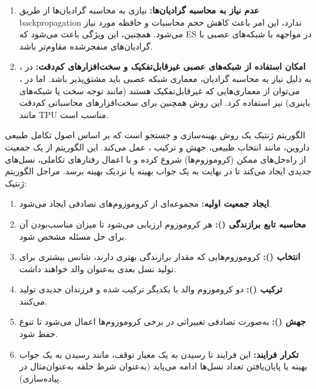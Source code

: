\documentclass[12pt]{exam}
\begin{document}
\begin{questions}
\begin{enumerate}
				\item \textbf{
				عدم نیاز به محاسبه گرادیان‌ها: 
				}
				نیازی به محاسبه گرادیان‌ها از طریق backpropagation ندارد، این امر باعث کاهش حجم محاسبات و حافظه مورد نیاز می‌شود. همچنین، این ویژگی باعث می‌شود که ES در مواجهه با شبکه‌های عصبی با گرادیان‌های منفجرشده
				 مقاوم‌تر باشد.
				\item \textbf{امکان استفاده از شبکه‌های عصبی غیرقابل‌تفکیک و سخت‌افزارهای کم‌دقت: }
				در
				،
				به دلیل نیاز به محاسبه گرادیان، معماری شبکه عصبی باید مشتق‌پذیر باشد. اما در
				،
				می‌توان از معماری‌هایی که غیرقابل‌تفکیک هستند (مانند توجه سخت یا شبکه‌های باینری) نیز استفاده کرد. این روش همچنین برای سخت‌افزارهای محاسباتی کم‌دقت مانند TPU مناسب است.
			\end{enumerate}
		\question الگوریتم ژنتیک  یک روش بهینه‌سازی و جستجو است که بر اساس اصول تکامل طبیعی داروین، مانند انتخاب طبیعی، جهش 
		 و ترکیب 
		، عمل می‌کند. این الگوریتم از یک جمعیت از راه‌حل‌های ممکن (کروموزوم‌ها) شروع کرده و با اعمال رفتارهای تکاملی، نسل‌های جدیدی ایجاد می‌کند تا در نهایت به یک جواب بهینه یا نزدیک بهینه برسد.
		\newline \newline
		مراحل الگوریتم ژنتیک:
		\begin{enumerate}
			\item \textbf{ایجاد جمعیت اولیه:}
			مجموعه‌ای از کروموزوم‌های تصادفی ایجاد می‌شود.
			\item \textbf{محاسبه تابع برازندگی ():}
			هر کروموزوم ارزیابی می‌شود تا میزان مناسب‌بودن آن برای حل مسئله مشخص شود.
			\item \textbf{	انتخاب ():}
			کروموزوم‌هایی که مقدار برازندگی بهتری دارند، شانس بیشتری برای تولید نسل بعدی به‌عنوان والد خواهند داشت.
			
			\item \textbf{	ترکیب ():}
			دو کروموزوم والد با یکدیگر ترکیب شده و فرزندان جدیدی تولید می‌کنند.
			
			
			\item \textbf{	جهش (): }
			به‌صورت تصادفی تغییراتی در برخی کروموزوم‌ها اعمال می‌شود تا تنوع حفظ شود.
			
			\item \textbf{تکرار فرایند: }
			این فرایند تا رسیدن به یک معیار توقف، مانند رسیدن به یک جواب بهینه یا پایان‌یافتن تعداد نسل‌ها ادامه می‌یابد (به‌عنوان شرط حلقه
			 به‌عنوان‌مثال در پیاده‌سازی).
			

\end{enumerate}
\end{questions}
\end{document}
